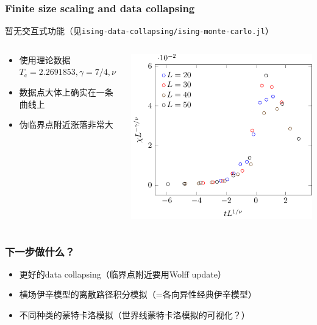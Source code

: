 \documentclass[UTF8]{ctexbeamer}
\begin{document}
\begin{frame}
\frametitle{Finite size scaling and data collapsing}

暂无交互式功能（见\texttt{ising-data-collapsing/ising-monte-carlo.jl}）

\begin{columns}

\begin{column}{0.5\textwidth}
    \begin{itemize}
        \item 使用理论数据$T_\text{c} = 2.2691853, \gamma = 7/4, \nu = 1$
        \item 数据点大体上确实在一条曲线上
        \item 伪临界点附近涨落非常大
    \end{itemize}
\end{column}

\begin{column}{0.5\textwidth}
    \includegraphics[width=\textwidth]{../ising-data-collapsing/ising-data-collapsing-run-1.pdf}
\end{column}

\end{columns}

\end{frame}

\begin{frame}
\frametitle{下一步做什么？}

\begin{itemize}
    \item 更好的data collapsing（临界点附近要用Wolff update）
    \item 横场伊辛模型的离散路径积分模拟（=各向异性经典伊辛模型）
    \item 不同种类的蒙特卡洛模拟（世界线蒙特卡洛模拟的可视化？）
\end{itemize}    

\end{frame}
\end{document}
